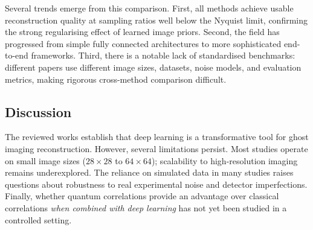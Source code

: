 Several trends emerge from this comparison. First, all methods achieve usable reconstruction quality at sampling ratios well below the Nyquist limit, confirming the strong regularising effect of learned image priors. Second, the field has progressed from simple fully connected architectures to more sophisticated end-to-end frameworks. Third, there is a notable lack of standardised benchmarks: different papers use different image sizes, datasets, noise models, and evaluation metrics, making rigorous cross-method comparison difficult.

\subsection{Discussion}

The reviewed works establish that deep learning is a transformative tool for ghost imaging reconstruction. However, several limitations persist. Most studies operate on small image sizes ($28\times28$ to $64\times64$); scalability to high-resolution imaging remains underexplored. The reliance on simulated data in many studies raises questions about robustness to real experimental noise and detector imperfections. Finally, whether quantum correlations provide an advantage over classical correlations \emph{when combined with deep learning} has not yet been studied in a controlled setting.
